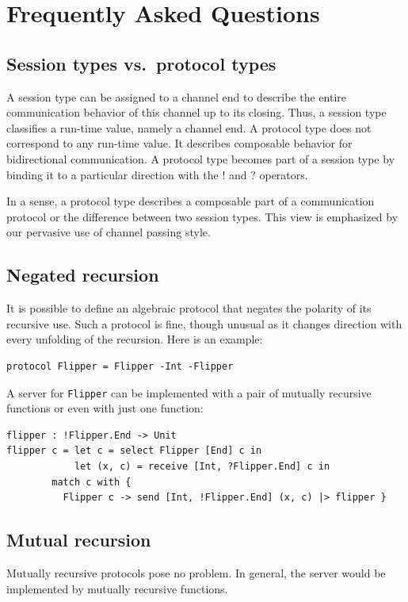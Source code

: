 \section{Frequently Asked Questions}
\label{sec:freq-asked-quest}

\subsection{Session types vs.\ protocol types}
\label{sec:what-diff-betw-1}
 A session type can be assigned to a channel end to describe
the entire communication behavior of this channel up to its closing. Thus, a
session type classifies a run-time value, namely a channel end.
A protocol type does not correspond to any run-time value.  It
describes composable behavior for bidirectional communication. A protocol
type becomes part of a session type by binding it to a particular
direction with the $!$ and $?$ operators.

In a sense, a protocol type describes a composable part of a
communication protocol or the difference between two session
types. This view is emphasized by our pervasive use of channel passing
style. 

\subsection{Negated recursion}
\label{sec:what-about-protocol}
It is possible to define an algebraic protocol that negates the polarity of its recursive use.
Such a protocol is fine, though unusual as it changes
direction with every unfolding of the recursion. Here is an example:
\begin{lstlisting}
protocol Flipper = Flipper -Int -Flipper
\end{lstlisting}
A server for \lstinline+Flipper+ can be implemented with a pair of
mutually recursive functions or even with just one function:
\begin{lstlisting}
flipper : !Flipper.End -> Unit
flipper c = let c = select Flipper [End] c in
            let (x, c) = receive [Int, ?Flipper.End] c in
	    match c with {
	      Flipper c -> send [Int, !Flipper.End] (x, c) |> flipper }
\end{lstlisting}

\subsection{Mutual recursion}
\label{sec:do-you-support}
Mutually recursive protocols pose no problem. In general, the server
would be implemented by mutually recursive functions.

